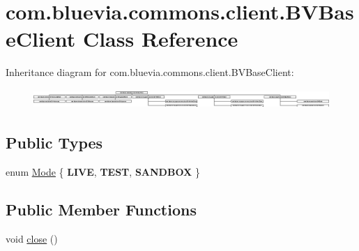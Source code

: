 \hypertarget{classcom_1_1bluevia_1_1commons_1_1client_1_1BVBaseClient}{
\section{com.bluevia.commons.client.BVBaseClient Class Reference}
\label{classcom_1_1bluevia_1_1commons_1_1client_1_1BVBaseClient}
}
Inheritance diagram for com.bluevia.commons.client.BVBaseClient:\begin{figure}[H]
\begin{center}
\leavevmode
\includegraphics[height=0.749665cm]{classcom_1_1bluevia_1_1commons_1_1client_1_1BVBaseClient}
\end{center}
\end{figure}
\subsection*{Public Types}
\begin{DoxyCompactItemize}
\item 
enum \hyperlink{classcom_1_1bluevia_1_1commons_1_1client_1_1BVBaseClient_a5f4a4a27d73a8ddd0ce450a6c7a4d1b7}{Mode} \{ {\bfseries LIVE}, 
{\bfseries TEST}, 
{\bfseries SANDBOX}
 \}
\end{DoxyCompactItemize}
\subsection*{Public Member Functions}
\begin{DoxyCompactItemize}
\item 
void \hyperlink{classcom_1_1bluevia_1_1commons_1_1client_1_1BVBaseClient_a3a49486d53ab64d1a21db764f5b562c3}{close} ()
\end{DoxyCompactItemize}
